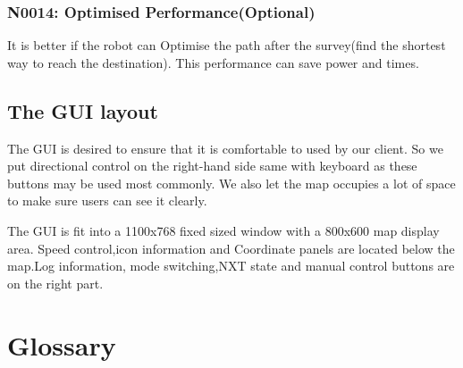 \documentclass[11pt, a4paper]{report}
\begin{document}
\subsection{N0014: Optimised Performance(Optional)}
It is better if the robot can Optimise the path after the survey(find the shortest way to reach the destination). This performance can save power and times.


\section{The GUI layout}

The GUI is desired to ensure that it is comfortable to used by our client. So we put directional control on the right-hand side same with keyboard as these buttons may be used most commonly. We also let the map occupies a lot of space to make sure users can see it clearly.

The GUI is fit into a 1100x768 fixed sized window with a 800x600 map display area. Speed control,icon information and Coordinate panels are located below the map.Log information, mode switching,NXT state and manual control buttons are on the right part.


\pagebreak

\newpage
\appendix

\pagebreak

\chapter{Glossary}
\end{document}
